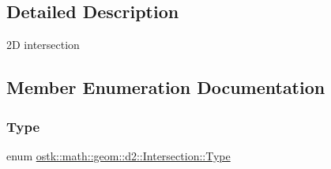 \subsection{Detailed Description}
2D intersection 

\subsection{Member Enumeration Documentation}
\mbox{\label{classostk_1_1math_1_1geom_1_1d2_1_1_intersection_a8712ffbb37647ed5212ff8ba6da68b00}} 
\subsubsection{\texorpdfstring{Type}{Type}}
{\footnotesize\ttfamily enum \hyperlink{classostk_1_1math_1_1geom_1_1d2_1_1_intersection_a8712ffbb37647ed5212ff8ba6da68b00}{ostk\+::math\+::geom\+::d2\+::\+Intersection\+::\+Type}\hspace{0.3cm}{\ttfamily [strong]}}


